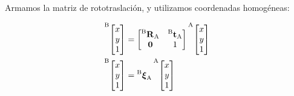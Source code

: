 \begin{frame}
Armamos la matriz de rototraslación, y utilizamos coordenadas homogéneas:

    \begin{align*}
        \toCoord{\begin{bmatrix}
            x\\
            y\\
            1
        \end{bmatrix}}{B} &=
        \begin{bmatrix}
            \rotationCoord{B}{A} & \translationCoord{B}{A}\\
            \vec{0} & 1
        \end{bmatrix}
        \toCoord{\begin{bmatrix}
            x\\
            y\\
            1
        \end{bmatrix}}{A}\\
        \toCoord{\begin{bmatrix}
            x\\
            y\\
            1
        \end{bmatrix}}{B} &=
        \transform{B}{A}
        \toCoord{\begin{bmatrix}
            x\\
            y\\
            1
        \end{bmatrix}}{A}
    \end{align*}


\end{frame}


